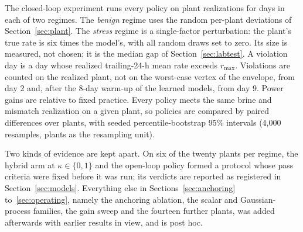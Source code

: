 The closed-loop experiment runs every policy on  plant
realizations for  days in each of two regimes. The
\emph{benign} regime uses the random per-plant deviations of
Section~\ref{sec:plant}. The \emph{stress} regime is a single-factor
perturbation: the plant's true rate is six times the model's, with all
random draws set to zero. Its size is measured, not chosen; it is the
median gap of Section~\ref{sec:labtest}. A violation day is a day whose
realized trailing-24-h mean rate exceeds $r_{\max}$. Violations are
counted on the realized plant, not on the worst-case vertex of the
envelope, from day 2 and, after the 8-day warm-up of the learned models,
from day 9. Power gains are relative to fixed practice. Every policy
meets the same brine and mismatch realization on a given plant, so
policies are compared by paired differences over plants, with seeded
percentile-bootstrap 95\% intervals (4{,}000 resamples, plants as the
resampling unit).

Two kinds of evidence are kept apart. On six of the twenty plants per
regime, the hybrid arm at $\kappa \in \{0, 1\}$ and the open-loop
policy formed a protocol whose pass criteria were fixed before it was
run; its verdicts are reported as registered in
Section~\ref{sec:models}. Everything else in
Sections~\ref{sec:anchoring} to~\ref{sec:operating}, namely the
anchoring ablation, the scalar and Gaussian-process families, the gain
sweep and the fourteen further plants, was added afterwards with
earlier results in view, and is post hoc.
